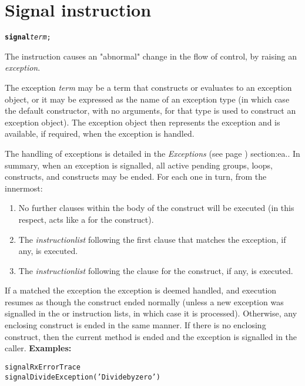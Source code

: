 \chapter{Signal instruction}\label{refsignal}
\index{,}
\index{,}
\begin{shaded}
\begin{alltt}
\textbf{signal} \emph{term};
\end{alltt}
\end{shaded}
 The  instruction causes an "abnormal" change
in the flow of control, by raising an \emph{exception}.
 
The exception \emph{term} may be a term that constructs or evaluates
to an exception object, or it may be expressed as the name of an
exception type (in which case the default constructor, with no
arguments, for that type is used to construct an exception object).
The exception object then represents the exception and is available, if
required, when the exception is handled.
 
The handling of exceptions is detailed in the
 \emph{Exceptions} (see page \pageref{refexcep}) 
section:ea..
In summary, when an exception is signalled, all active pending
 groups,  loops,  constructs, and
 constructs may be ended.
For each one in turn, from the innermost:
\begin{enumerate}
\item No further clauses within the body of the construct will be executed
(in this respect,  acts like a  for the
construct).
\item The \emph{instructionlist} following the first 
clause that matches the exception, if any, is executed.
\item The \emph{instructionlist} following the 
clause for the construct, if any, is executed.
\end{enumerate}
If a  matched the exception the exception is deemed
handled, and execution resumes as though the construct ended normally
(unless a new exception was signalled in the  or
 instruction lists, in which case it is processed).
Otherwise, any enclosing construct is ended in the same manner.
If there is no enclosing construct, then the current method is ended and
the exception is signalled in the caller.
 \textbf{Examples:}
\begin{alltt}
signal RxErrorTrace
signal DivideException('Divide by zero')
\end{alltt}

